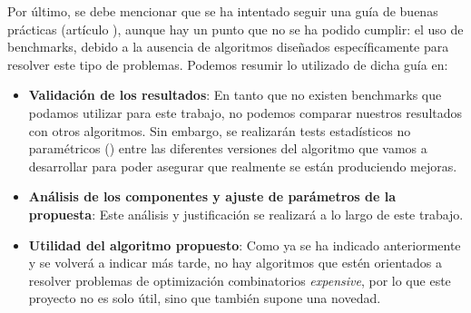 
Por último, se debe mencionar que se ha intentado seguir una guía de buenas prácticas (artículo \parencite{latorrePrescriptionMethodologicalGuidelines2021}), aunque hay un punto que no se ha podido cumplir: el uso de benchmarks, debido a la ausencia de algoritmos diseñados específicamente para resolver este tipo de problemas. 
Podemos resumir lo utilizado de dicha guía en: 
\begin{itemize}
	\item \textbf{Validación de los resultados}: 
	En tanto que no existen benchmarks que podamos utilizar para este trabajo, no podemos comparar nuestros resultados con otros algoritmos. 
	Sin embargo, se realizarán tests estadísticos no paramétricos (\parencite{derracPracticalTutorialUse2011}) entre las diferentes versiones del algoritmo que vamos a desarrollar para poder asegurar que realmente se están produciendo mejoras. 
	
	\item \textbf{Análisis de los componentes y ajuste de parámetros de la propuesta}: 
	Este análisis y justificación se realizará a lo largo de este trabajo.
	
	\item \textbf{Utilidad del algoritmo propuesto}: 
	Como ya se ha indicado anteriormente y se volverá a indicar más tarde, no hay algoritmos que estén orientados a resolver problemas de optimización combinatorios \textit{expensive}, por lo que este proyecto no es solo útil, sino que también supone una novedad.
	
\end{itemize}